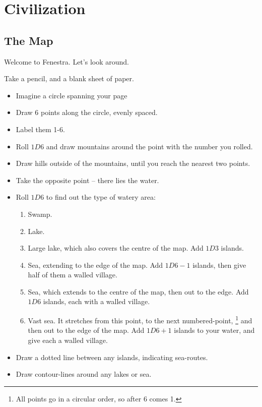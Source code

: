 \chapter{Civilization}

\section{The Map}

\begin{multicols}{2}

Welcome to Fenestra. Let's look around.


Take a pencil, and a blank sheet of paper.

\begin{itemize}
\item
  Imagine a circle spanning your page
\item
  Draw 6 points along the circle, evenly spaced.
\item
  Label them 1-6.
\item
  Roll $1D6$ and draw mountains around the point with the number you rolled.
\item
  Draw hills outside of the mountains, until you reach the nearest two
  points.
\item
  Take the opposite point -- there lies the water.
\item
  Roll $1D6$ to find out the type of watery area:

  \begin{enumerate}
  \item
    Swamp.
  \item
    Lake.
  \item
    Large lake, which also covers the centre of the map.
    Add $1D3$ islands.
  \item
    Sea, extending to the edge of the map.
    Add $1D6-1$ islands, then give half of them a walled village.
  \item
    Sea, which extends to the centre of the map, then out to the edge.
    Add $1D6$ islands, each with a walled village.
  \item
    Vast sea. It stretches from this point, to the next numbered-point,%
    \footnote{All points go in a circular order, so after 6 comes 1.}
    and then out to the edge of the map.
    Add $1D6+1$ islands to your water, and give each a walled village.
  \end{enumerate}
\item
  Draw a dotted line between any islands, indicating sea-routes.
\item
  Draw contour-lines around any lakes or sea.
\end{itemize}


\end{multicols}
